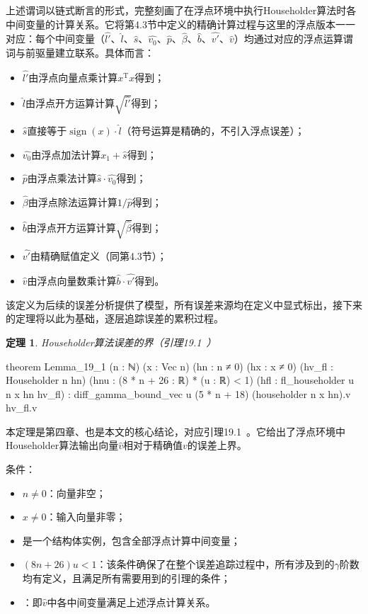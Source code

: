 ﻿\documentclass[UTF8,a4paper,openany]{ctexbook}
\DeclareMathOperator{\sign}{sign}
\theoremstyle{qrplain}
\newtheorem{theorem}[definition]{定理}
\begin{document}
上述谓词以链式断言的形式，完整刻画了在浮点环境中执行Householder算法时各中间变量的计算关系。它将第4.3节中定义的精确计算过程与这里的浮点版本一一对应：每个中间变量（$\hat{l'}$、$\hat{l}$、$\hat{s}$、$\hat{v_0}$、$\hat{p}$、$\hat{\beta}$、$\hat{b}$、$\hat{v'}$、$\hat{v}$）均通过对应的浮点运算谓词与前驱量建立联系。具体而言：

\begin{itemize}
  \item $\hat{l'}$由浮点向量点乘计算$x^\mathrm{T}x$得到；
  \item $\hat{l}$由浮点开方运算计算$\sqrt{\hat{l'}}$得到；
  \item $\hat{s}$直接等于$\sign(x)\cdot\hat{l}$（符号运算是精确的，不引入浮点误差）；
  \item $\hat{v_0}$由浮点加法计算$x_1+\hat{s}$得到；
  \item $\hat{p}$由浮点乘法计算$\hat{s}\cdot\hat{v_0}$得到；
  \item $\hat{\beta}$由浮点除法运算计算$1/\hat{p}$得到；
  \item $\hat{b}$由浮点开方运算计算$\sqrt{\hat{\beta}}$得到；
  \item $\hat{v'}$由精确赋值定义（同第4.3节）；
  \item $\hat{v}$由浮点向量数乘计算$\hat{b}\cdot\hat{v'}$得到。
\end{itemize}

该定义为后续的误差分析提供了模型，所有误差来源均在定义中显式标出，接下来的定理将以此为基础，逐层追踪误差的累积过程。

\begin{theorem}
  Householder算法误差的界（引理19.1~\cite{higham2002}）
\end{theorem}
\begin{leancode}
  theorem Lemma_19_1 (n : ℕ) (x : Vec n) 
    (hn : n ≠ 0) (hx : x ≠ 0) 
    (hv_fl : Householder n hn) 
    (hnu : (8 * n + 26 : ℝ) * (u : ℝ) < 1) 
    (hfl : fl_householder u n x hn hv_fl) :
      diff_gamma_bound_vec u (5 * n + 18)
      (householder n x hn).v hv_fl.v
\end{leancode}

本定理是第四章、也是本文的核心结论，对应引理19.1~\cite{higham2002}。它给出了浮点环境中Householder算法输出向量$\hat{v}$相对于精确值$v$的误差上界。

条件：
\begin{itemize}
  \item $n\neq0$：向量非空；
  \item $x\neq0$：输入向量非零；
  \item {}是一个结构体实例，包含全部浮点计算中间变量；
  \item $(8n+26)u<1$：该条件确保了在整个误差追踪过程中，所有涉及到的$\gamma$阶数均有定义，且满足所有需要用到的引理的条件；
  \item {}：即$\hat{v}$中各中间变量满足上述浮点计算关系。
\end{itemize}
\end{document}
